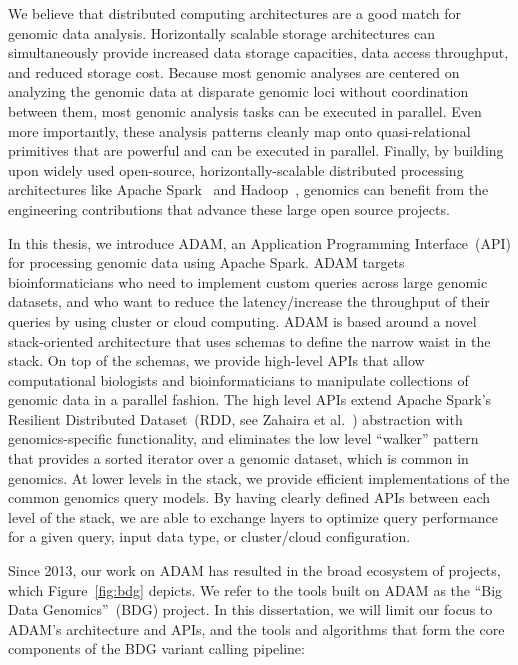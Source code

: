 \documentclass[phd]{ucbthesis}
\begin{document}
We believe that distributed computing architectures are a good match for
genomic data analysis. Horizontally scalable storage architectures can
simultaneously provide increased data storage capacities, data access
throughput, and reduced storage cost. Because most genomic analyses are centered
on analyzing the genomic data at disparate genomic loci without coordination
between them, most genomic analysis tasks can be executed in parallel. Even more
importantly, these analysis patterns cleanly map onto quasi-relational primitives
that are powerful and can be executed in parallel. Finally, by building upon
widely used open-source, horizontally-scalable distributed processing architectures like {Apache
Spark}~\cite{zaharia12} and {Hadoop}~\cite{hadoop}, genomics can benefit
from the engineering contributions that advance these large open source projects.

In this thesis, we introduce {ADAM}, an Application Programming
Interface~(API) for processing genomic data using Apache Spark. {ADAM} targets
bioinformaticians who need to implement custom queries across large genomic
datasets, and who want to reduce the latency/increase the throughput of their
queries by using cluster or cloud computing. ADAM
is based around a novel stack-oriented architecture that uses schemas to define
the narrow waist in the stack. On top of the schemas, we provide high-level
APIs that allow computational biologists and bioinformaticians to manipulate
collections of genomic data in a parallel fashion. The high level APIs extend
{Apache Spark}'s Resilient Distributed Dataset~(RDD, see Zahaira et
al.~\cite{zaharia12}) abstraction with genomics-specific functionality, and
eliminates the low level ``walker'' pattern~\cite{mckenna10} that provides a
sorted iterator over a genomic dataset, which is common in
genomics. At lower levels in the stack, we provide efficient implementations
of the common genomics query models. By having clearly defined APIs between
each level of the stack, we are able to exchange layers to optimize query
performance for a given query, input data type, or cluster/cloud configuration.

Since 2013, our work on {ADAM} has resulted in the broad ecosystem of projects,
which Figure~\ref{fig:bdg} depicts. We refer to the tools built on {ADAM}
as the ``Big Data Genomics''~(BDG) project. In this dissertation, we will limit
our focus to {ADAM}'s architecture and APIs, and the tools and algorithms
that form the core components of the BDG variant calling pipeline:
\end{document}
